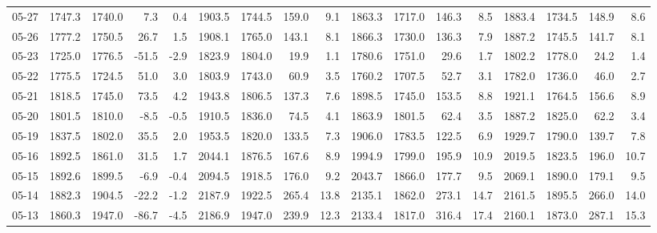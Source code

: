\begin{threeparttable}
{\begin{tabular}{lrrrrrrrrrrrrrrrr}
  05-27 & 1747.3 & 1740.0 &        7.3 &            0.4 & 1903.5 & 1744.5 &      159.0 &            9.1 & 1863.3 & 1717.0 &      146.3 &            8.5 & 1883.4 & 1734.5 &       148.9 &              8.6 \\
  05-26 & 1777.2 & 1750.5 &       26.7 &            1.5 & 1908.1 & 1765.0 &      143.1 &            8.1 & 1866.3 & 1730.0 &      136.3 &            7.9 & 1887.2 & 1745.5 &       141.7 &              8.1 \\
  05-23 & 1725.0 & 1776.5 &      -51.5 &           -2.9 & 1823.9 & 1804.0 &       19.9 &            1.1 & 1780.6 & 1751.0 &       29.6 &            1.7 & 1802.2 & 1778.0 &        24.2 &              1.4 \\
  05-22 & 1775.5 & 1724.5 &       51.0 &            3.0 & 1803.9 & 1743.0 &       60.9 &            3.5 & 1760.2 & 1707.5 &       52.7 &            3.1 & 1782.0 & 1736.0 &        46.0 &              2.7 \\
  05-21 & 1818.5 & 1745.0 &       73.5 &            4.2 & 1943.8 & 1806.5 &      137.3 &            7.6 & 1898.5 & 1745.0 &      153.5 &            8.8 & 1921.1 & 1764.5 &       156.6 &              8.9 \\
  05-20 & 1801.5 & 1810.0 &       -8.5 &           -0.5 & 1910.5 & 1836.0 &       74.5 &            4.1 & 1863.9 & 1801.5 &       62.4 &            3.5 & 1887.2 & 1825.0 &        62.2 &              3.4 \\
  05-19 & 1837.5 & 1802.0 &       35.5 &            2.0 & 1953.5 & 1820.0 &      133.5 &            7.3 & 1906.0 & 1783.5 &      122.5 &            6.9 & 1929.7 & 1790.0 &       139.7 &              7.8 \\
  05-16 & 1892.5 & 1861.0 &       31.5 &            1.7 & 2044.1 & 1876.5 &      167.6 &            8.9 & 1994.9 & 1799.0 &      195.9 &           10.9 & 2019.5 & 1823.5 &       196.0 &             10.7 \\
  05-15 & 1892.6 & 1899.5 &       -6.9 &           -0.4 & 2094.5 & 1918.5 &      176.0 &            9.2 & 2043.7 & 1866.0 &      177.7 &            9.5 & 2069.1 & 1890.0 &       179.1 &              9.5 \\
  05-14 & 1882.3 & 1904.5 &      -22.2 &           -1.2 & 2187.9 & 1922.5 &      265.4 &           13.8 & 2135.1 & 1862.0 &      273.1 &           14.7 & 2161.5 & 1895.5 &       266.0 &             14.0 \\
  05-13 & 1860.3 & 1947.0 &      -86.7 &           -4.5 & 2186.9 & 1947.0 &      239.9 &           12.3 & 2133.4 & 1817.0 &      316.4 &           17.4 & 2160.1 & 1873.0 &       287.1 &             15.3 \\

\end{tabular}}
\end{threeparttable}
